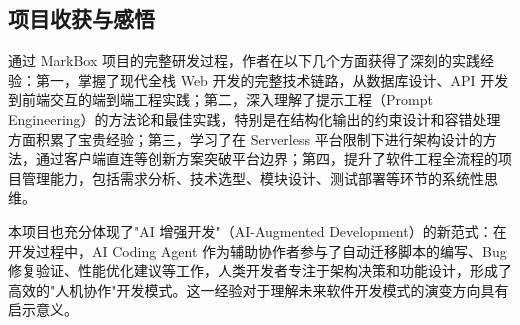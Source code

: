 \documentclass[12pt,a4paper]{ctexart}
\begin{document}
\subsection{项目收获与感悟}

通过 MarkBox 项目的完整研发过程，作者在以下几个方面获得了深刻的实践经验：第一，掌握了现代全栈 Web 开发的完整技术链路，从数据库设计、API 开发到前端交互的端到端工程实践；第二，深入理解了提示工程（Prompt Engineering）的方法论和最佳实践，特别是在结构化输出的约束设计和容错处理方面积累了宝贵经验；第三，学习了在 Serverless 平台限制下进行架构设计的方法，通过客户端直连等创新方案突破平台边界；第四，提升了软件工程全流程的项目管理能力，包括需求分析、技术选型、模块设计、测试部署等环节的系统性思维。

本项目也充分体现了"AI 增强开发"（AI-Augmented Development）的新范式：在开发过程中，AI Coding Agent 作为辅助协作者参与了自动迁移脚本的编写、Bug 修复验证、性能优化建议等工作，人类开发者专注于架构决策和功能设计，形成了高效的"人机协作"开发模式\cite{ref:ai-augmented-dev}。这一经验对于理解未来软件开发模式的演变方向具有启示意义。
\end{document}
